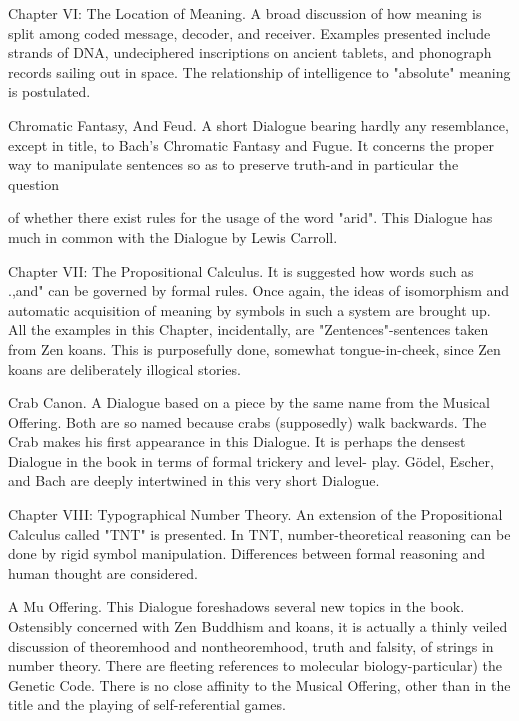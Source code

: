 Chapter VI: The Location of Meaning. A broad discussion of how meaning is split among coded
  message, decoder, and receiver. Examples presented include strands of DNA, undeciphered
  inscriptions on ancient tablets, and phonograph records sailing out in space. The relationship of
  intelligence to "absolute" meaning is postulated.

Chromatic Fantasy, And Feud. A short Dialogue bearing hardly any resemblance, except in title, to
  Bach's Chromatic Fantasy and Fugue. It concerns the proper way to manipulate sentences so as
  to preserve truth-and in particular the question





   of whether there exist rules for the usage of the word "arid". This Dialogue has much in common
   with the Dialogue by Lewis Carroll.

Chapter VII: The Propositional Calculus. It is suggested how words such as .,and" can be
  governed by formal rules. Once again, the ideas of isomorphism and automatic acquisition of
  meaning by symbols in such a system are brought up. All the examples in this Chapter,
  incidentally, are "Zentences"-sentences taken from Zen koans. This is purposefully done,
  somewhat tongue-in-cheek, since Zen koans are deliberately illogical stories.

Crab Canon. A Dialogue based on a piece by the same name from the Musical Offering. Both are so
  named because crabs (supposedly) walk backwards. The Crab makes his first appearance in this
  Dialogue. It is perhaps the densest Dialogue in the book in terms of formal trickery and level-
  play. Gödel, Escher, and Bach are deeply intertwined in this very short Dialogue.

Chapter VIII: Typographical Number Theory. An extension of the Propositional Calculus called
  "TNT" is presented. In TNT, number-theoretical reasoning can be done by rigid symbol
  manipulation. Differences between formal reasoning and human thought are considered.

A Mu Offering. This Dialogue foreshadows several new topics in the book. Ostensibly concerned
  with Zen Buddhism and koans, it is actually a thinly veiled discussion of theoremhood and
  nontheoremhood, truth and falsity, of strings in number theory. There are fleeting references to
  molecular biology-particular) the Genetic Code. There is no close affinity to the Musical
  Offering, other than in the title and the playing of self-referential games.

